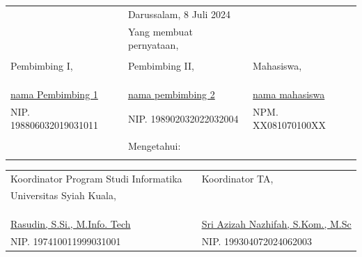 \vspace{0.4cm}
{\renewcommand{\arraystretch}{0.8}
\centering
\begin{tabular}{lll}
	&Darussalam, 8 Juli 2024		& \\
	&Yang membuat pernyataan,			& \\
	&&\\
	Pembimbing I,							&Pembimbing II,							&Mahasiswa,\\
	&&\\
	&&\\
	&&\\
	\underline{nama Pembimbing 1}	&\underline{nama pembimbing 2} &\underline{nama mahasiswa}\\
	NIP. 198806032019031011				&NIP. 198902032022032004				&NPM. XX081070100XX\\
	&&\\
	&Mengetahui:\\			&
\end{tabular}
}
{\renewcommand{\arraystretch}{0.8}
\begin{tabular}{lll}
	Koordinator Program Studi Informatika	&\qquad\qquad  &Koordinator TA,\\
	Universitas Syiah Kuala,&\quad\quad  &\\
	&&\\
	&&\\
	&&\\
	\underline{Rasudin, S.Si., M.Info. Tech}	&\quad\quad  &\underline{Sri Azizah Nazhifah, S.Kom., M.Sc}\\
	NIP. 197410011999031001						&\quad\quad  &NIP. 199304072024062003				
\end{tabular}
}
